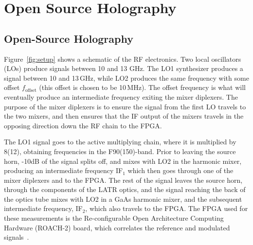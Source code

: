 \chapter{Open Source Holography} %
\label{app:holog}

\section{Open-Source Holography}
\label{sec:appendix_hardware}

Figure~\ref{fig:setup} shows a schematic of the RF electronics.  Two local oscillators (LOs) produce signals between 10 and 13 GHz. The LO1 synthesizer produces a signal between 10 and 13\,GHz, while LO2 produces the same frequency with some offset $f_{\text{offset}}$ (this offset is chosen to be 10\,MHz).  The offset frequency is what will eventually produce an intermediate frequency exiting the mixer diplexers.  The purpose of the mixer diplexers is to ensure the signal from the first LO travels to the two mixers, and then ensures that the IF output of the mixers travels in the opposing direction down the RF chain to the FPGA.

The LO1 signal goes to the active multiplying chain, where it is multiplied by 8(12), obtaining frequencies in the F90(150)-band.  Prior to leaving the source horn, -10dB of the signal splits off, and mixes with LO2 in the harmonic mixer, producing an intermediate frequency IF$_1$ which then goes through one of the mixer diplexers and to the FPGA.  The rest of the signal leaves the source horn, through the components of the LATR optics, and the signal reaching the back of the optics tube mixes with LO2 in a GaAs harmonic mixer, and the subsequent intermediate frequency, IF$_2$, which also travels to the FPGA.  The FPGA used for these measurements is the Re-configurable Open Architecture Computing Hardware (ROACH-2) board, which correlates the reference and modulated signals~\cite{roach2}.

